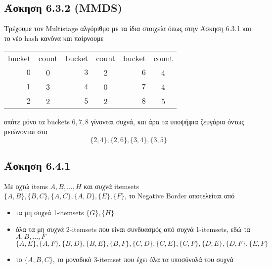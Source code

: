 \documentclass[a4paper,11pt]{article}
\begin{document}
\subsection*{Άσκηση 6.3.2 (MMDS)}
Τρέχουμε τον Multistage αλγόριθμο με τα ίδια στοιχεία όπως στην Άσκηση 6.3.1 και το νέο hash κανόνα και παίρνουμε
\begin{center}
	\begin{tabular}{| r | c || r | c || r | c |}
		\hline
		bucket & count & bucket & count & bucket & count \\ \hhline{|=|=#=|=#=|=|}
		$0$ & 0 & $3$ & 2 & $6$ & 4 \\ \hline
		$1$ & 3 & $4$ & 0 & $7$ & 4 \\ \hline
		$2$ & 2 & $5$ & 2 & $8$ & 5 \\ \hline
	\end{tabular}
\end{center}
οπότε μόνο τα buckets $6,7,8$ γίνονται συχνά, και άρα τα υποψήφια ζευγάρια όντως μειώνονται στα
\[\{2,4\},\{2,6\},\{3,4\},\{3,5\}\]


\subsection*{Άσκηση 6.4.1}

Με οχτώ items $A,B,\dots,H$ και συχνά itemsets $\{A,B\},\{B,C\},\{A,C\},\{A,D\},\{E\},\{F\}$, το Negative Border αποτελείται από
\begin{itemize}
	\item τα μη συχνά 1-itemsets $\{G\},\{H\}$
	\item όλα τα μη συχνά 2-itemsets που είναι συνδυασμός από συχνά 1-itemsets, εδώ τα $A,B,\dots,F$
		\[
			\{A,E\},\{A,F\},\{B,D\},\{B,E\},\{B,F\},\{C,D\},\{C,E\},\{C,F\},\{D,E\},\{D,F\},\{E,F\}
		\]
	\item το $\{A,B,C\}$, το μοναδικό 3-itemset που έχει όλα τα υποσύνολά του συχνά
\end{itemize}
\end{document}
